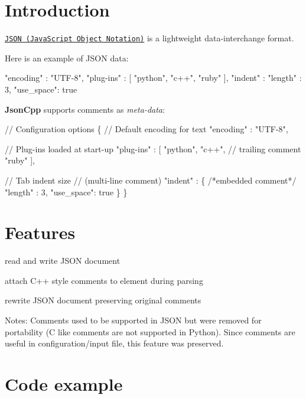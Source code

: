 \hypertarget{index__intro}{}\section{Introduction}\label{index__intro}
\href{http://www.json.org/}{\tt J\+S\+ON (Java\+Script Object Notation)} is a lightweight data-\/interchange format.

Here is an example of J\+S\+ON data\+: \begin{DoxyVerb}{
    "encoding" : "UTF-8",
    "plug-ins" : [
        "python",
        "c++",
        "ruby"
        ],
    "indent" : { "length" : 3, "use_space": true }
}
\end{DoxyVerb}
 {\bfseries Json\+Cpp} supports comments as {\itshape meta-\/data}\+: 
\begin{DoxyCode}
\textcolor{comment}{// Configuration options}
\{
    \textcolor{comment}{// Default encoding for text}
    \textcolor{stringliteral}{"encoding"} : \textcolor{stringliteral}{"UTF-8"},
    
    \textcolor{comment}{// Plug-ins loaded at start-up}
    \textcolor{stringliteral}{"plug-ins"} : [
        \textcolor{stringliteral}{"python"},
        \textcolor{stringliteral}{"c++"},  \textcolor{comment}{// trailing comment}
        \textcolor{stringliteral}{"ruby"}
        ],
        
    \textcolor{comment}{// Tab indent size}
    \textcolor{comment}{// (multi-line comment)}
    \textcolor{stringliteral}{"indent"} : \{ \textcolor{comment}{/*embedded comment*/} \textcolor{stringliteral}{"length"} : 3, \textcolor{stringliteral}{"use\_space"}: \textcolor{keyword}{true} \}
\}
\end{DoxyCode}
\hypertarget{index__features}{}\section{Features}\label{index__features}

\begin{DoxyItemize}
\item read and write J\+S\+ON document
\item attach C++ style comments to element during parsing
\item rewrite J\+S\+ON document preserving original comments
\end{DoxyItemize}

Notes\+: Comments used to be supported in J\+S\+ON but were removed for portability (C like comments are not supported in Python). Since comments are useful in configuration/input file, this feature was preserved.\hypertarget{index__example}{}\section{Code example}\label{index__example}

